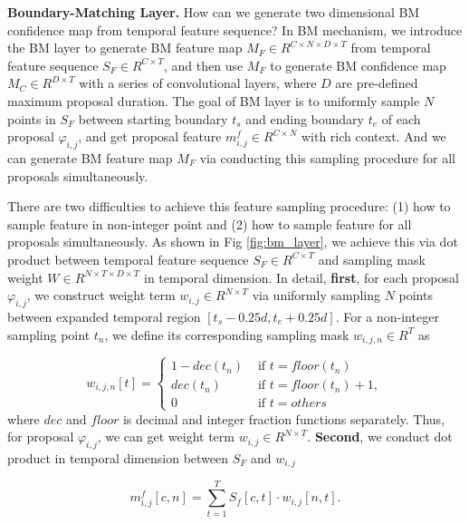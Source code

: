 \documentclass[10pt,twocolumn,letterpaper]{article}
\begin{document}
\noindent
\textbf{Boundary-Matching Layer.} 
%
How can we generate two dimensional BM confidence map from temporal feature sequence?
%
In BM mechanism, we introduce the BM layer to generate BM feature map $M_F \in R^{C \times N \times D \times T}$ from temporal feature sequence $S_F \in R^{C \times T}$, and then use $M_F$ to generate BM confidence map $M_C \in R^{D\times T}$ with a series of convolutional layers, where $D$ are pre-defined maximum proposal duration.
%
The goal of BM layer is to uniformly sample $N$ points in $S_F$ between starting boundary $t_s$ and ending boundary $t_e$ of each proposal $\varphi_{i,j}$, and get proposal feature $m^f_{i,j} \in R^{C\times N}$ with rich context.
%
And we can generate BM feature map $M_F$ via conducting this sampling procedure for all proposals simultaneously.



There are two difficulties to achieve this feature sampling procedure: (1) how to sample feature in non-integer point and (2) how to sample feature for all proposals simultaneously.
%
As shown in Fig \ref{fig:bm_layer}, we achieve this via dot product between temporal feature sequence $S_F \in R^{C\times T}$ and sampling mask weight  $W  \in R^{N\times T \times D \times T}$ in temporal dimension.
%
In detail, \textbf{first}, for each proposal $\varphi_{i,j}$, we construct  weight term $w_{i,j} \in R^{N\times T}$ via uniformly sampling $N$ points between expanded temporal region $[ t_s - 0.25d, t_e + 0.25d]$. 
%
For a non-integer sampling point $t_n$, we define its corresponding sampling mask $w_{i,j,n} \in R^T$ as

\begin{equation}
w_{i,j,n}[t]=
\begin{cases}
1 - dec(t_n) & \text{ if } t= floor(t_n)\\ 
dec(t_n) & \text{ if } t= floor(t_n) +1,\\ 
0 & \text{ if } t= others
\end{cases}
\end{equation}
%
where $dec$ and $floor$ is decimal and integer fraction functions separately.
%
Thus, for proposal $\varphi_{i,j}$, we can get weight term $w_{i,j} \in R^{N\times T}$.
%
\textbf{Second}, we conduct dot product in temporal dimension between $S_F$ and $w_{i,j}$
 
\begin{equation}
 m^f_{i,j}[c,n] = \sum_{t=1}^T S_f[c,t] \cdot  w_{i,j}[n,t].
\end{equation}
\end{document}
